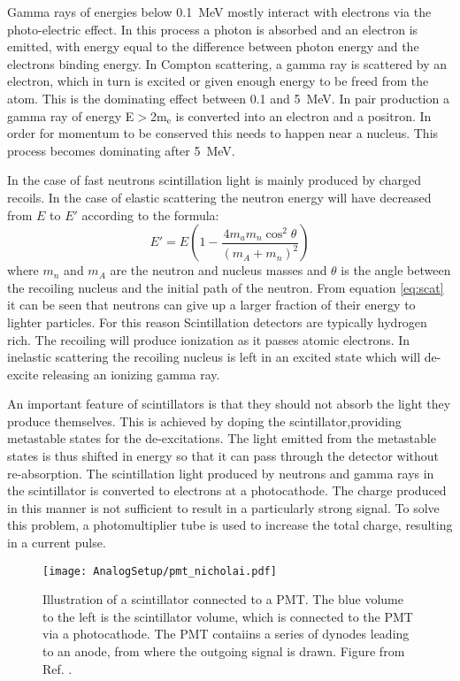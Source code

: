 \documentclass[main.tex]{subfiles}
\begin{document}
Gamma rays of energies below \SI{0.1}{\MeV} mostly interact with electrons via the photo-electric effect. In this process a photon is absorbed and an electron is emitted, with energy equal to the difference between photon energy and the electrons binding energy. In Compton scattering, a gamma ray is scattered by an electron, which in turn is excited or given enough energy to be freed from the atom. This is the dominating effect between 0.1 and \SI{5}{\MeV}. In pair production a gamma ray of energy E$>$2m$_\text{e}$ is converted into an electron and a positron. In order for momentum to be conserved this needs to happen near a nucleus. This process becomes dominating after \SI{5}{\MeV}\cite{Krane}.

In the case of fast neutrons scintillation light is mainly produced by charged recoils. In the case of elastic scattering the neutron energy will have decreased from $E$ to $E'$ according to the formula:
\begin{equation}
	E' = E\left(1 - \frac{4m_a m_n \cos^2{\theta}}{\left(m_A + m_n\right)^2}\right)
	\label{eq:scat}
\end{equation}
where $m_n$ and $m_A$ are the neutron and nucleus masses and $\theta$ is the angle between the recoiling nucleus and the initial path of the neutron. From equation \ref{eq:scat} it can be seen that neutrons can give up a larger fraction of their energy to lighter particles. For this reason Scintillation detectors are typically hydrogen rich. The recoiling will produce ionization as it passes atomic electrons. In inelastic scattering the recoiling nucleus is left in an excited state which will de-excite releasing an ionizing gamma ray.

An important feature of scintillators is that they should not absorb the light they produce themselves. This is achieved by doping the scintillator,providing metastable states for the de-excitations. The light emitted from the metastable states is thus shifted in energy so that it can pass through the detector without re-absorption. The scintillation light produced by neutrons and gamma rays in the scintillator is converted to electrons at a photocathode. The charge produced in this manner is not sufficient to result in a particularly strong signal. To solve this problem, a photomultiplier tube is used to increase the total charge, resulting in a current pulse. 

\begin{figure}[ht]
	\centering
    	\texttt{[image: AnalogSetup/pmt\_nicholai.pdf]}
        \caption[Illustration of a scintillator connected to a PMT]{Illustration of a scintillator connected to a PMT. The blue volume to the left is the scintillator volume, which is connected to the PMT via a photocathode. The PMT contaiins a series of dynodes leading to an anode, from where the outgoing signal is drawn. Figure from Ref. \cite{Mauritzsson}.}
	    \label{fig:pmt} 
\end{figure}
\end{document}

